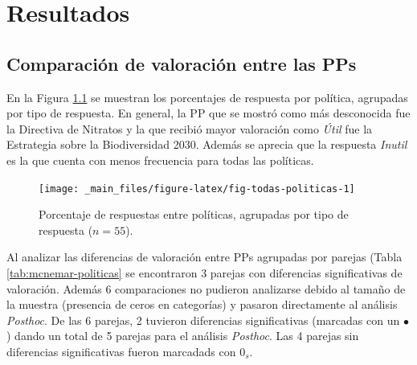 \documentclass[a4paper, nobind]{templates/ociamthesis}
\begin{document}
\hypertarget{resultados}{%
\chapter{Resultados}\label{resultados}}

\minitoc 

\hypertarget{comparaciuxf3n-de-valoraciuxf3n-entre-las-pps}{%
\section{Comparación de valoración entre las PPs}\label{comparaciuxf3n-de-valoraciuxf3n-entre-las-pps}}

En la Figura \ref{fig:fig-todas-politicas} se muestran los porcentajes de respuesta por política, agrupadas por tipo de respuesta. En general, la PP que se mostró como más desconocida fue la Directiva de Nitratos y la que recibió mayor valoración como \emph{Útil} fue la Estrategia sobre la Biodiversidad 2030. Además se aprecia que la respuesta \emph{Inutil} es la que cuenta con menos frecuencia para todas las políticas.

\begin{figure}
\texttt{[image: \_main\_files/figure-latex/fig-todas-politicas-1]} \caption[Políticas Públicas arupadas por respuesta]{Porcentaje de respuestas entre políticas, agrupadas por tipo de respuesta ($n=55$).}\label{fig:fig-todas-politicas}
\end{figure}

Al analizar las diferencias de valoración entre PPs agrupadas por parejas (Tabla \ref{tab:mcnemar-politicas} se encontraron 3 parejas con diferencias significativas de valoración. Además 6 comparaciones no pudieron analizarse debido al tamaño de la muestra (presencia de ceros en categorías) y pasaron directamente al análisis \emph{Posthoc}. De las 6 parejas, 2 tuvieron diferencias significativas (marcadas con un \(\bullet\)) dando un total de 5 parejas para el análisis \emph{Posthoc}. Las 4 parejas sin diferencias significativas fueron marcadads con \(0_s\).
\end{document}
